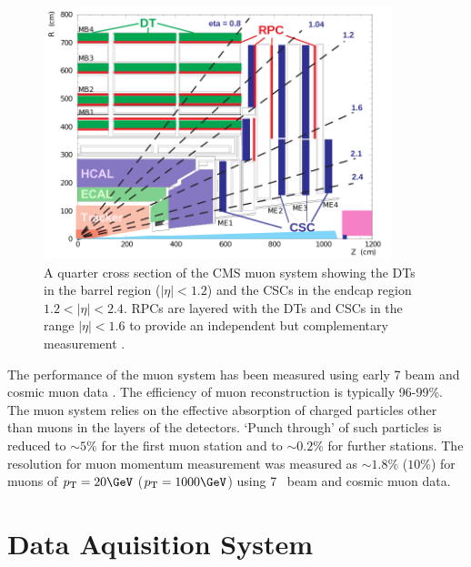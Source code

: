 \begin{figure}
\centering
    \includegraphics[width=0.9\textwidth]{./Figures/detector/muon_sys}
  \caption{A quarter cross section of the CMS muon system showing the DTs in the barrel region ($|\eta| < 1.2$) and the CSCs in the endcap
  region $ 1.2 < |\eta| < 2.4$. RPCs are layered with the DTs and CSCs in the range $|\eta| < 1.6$ to provide an independent but complementary measurement \cite{CMS}.}
  \label{fig:MUON_SLICE}
\end{figure}

The performance of the muon system has been measured using early 7 \TeV beam and cosmic muon data \cite{muon_performance}. 
The efficiency of muon reconstruction is typically 96-99\%. The muon system relies on the effective
absorption of charged particles other than muons in the layers of the detectors.
`Punch through' of such particles is reduced to $\sim 5\%$ for the first muon station and to
$\sim 0.2\%$ for further stations. The resolution for muon momentum measurement
was measured as $\sim 1.8\%$ ($10\%$) for muons of $\pt=20\GeV$ ($\pt=1000\GeV$) using 7 \TeV~beam and cosmic muon data. 

\section{Data Aquisition System}

